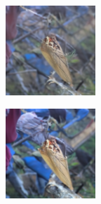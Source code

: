 \documentclass{article}
\begin{document}
\begin{figure}
\begin{subfigure}[b]{0.5\linewidth}
\begin{subfigure}[b]{0.242\linewidth}
        \end{subfigure}
        \hfill
    \end{subfigure}%
    \begin{subfigure}[b]{0.5\linewidth}
        \begin{subfigure}[b]{0.242\linewidth}
        \includegraphics[width=\linewidth]{figures/imagenet128/solver_samples/imagenet128_fm_ot_319_05.png}
        \end{subfigure}
        \begin{subfigure}[b]{0.242\linewidth}
        \includegraphics[width=\linewidth]{figures/imagenet128/solver_samples/imagenet128_fm_ot_319_10.png}

\end{subfigure}
\end{subfigure}
\end{figure}
\end{document}
